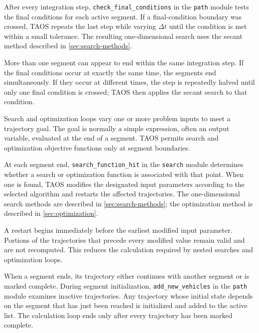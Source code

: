 After every integration step, \texttt{check\_final\_conditions} in the \texttt{path}
module tests the final conditions for each active segment. If a final-condition
boundary was crossed, TAOS repeats the last step while varying $\Delta t$ until the
condition is met within a small tolerance. The resulting one-dimensional search uses
the secant method described in \cref{sec:search-methods}.

More than one segment can appear to end within the same integration step. If the
final conditions occur at exactly the same time, the segments end simultaneously.
If they occur at different times, the step is repeatedly halved until only one final
condition is crossed; TAOS then applies the secant search to that condition.


Search and optimization loops vary one or more problem inputs to meet a trajectory
goal. The goal is normally a simple expression, often an output variable, evaluated
at the end of a segment. TAOS permits search and optimization objective functions
only at segment boundaries.

At each segment end, \texttt{search\_function\_hit} in the \texttt{search} module
determines whether a search or optimization function is associated with that point.
When one is found, TAOS modifies the designated input parameters according to the
selected algorithm and restarts the affected trajectories. The one-dimensional search
methods are described in \cref{sec:search-methods}; the optimization method is
described in \cref{sec:optimization}.

A restart begins immediately before the earliest modified input parameter. Portions
of the trajectories that precede every modified value remain valid and are not
recomputed. This reduces the calculation required by nested searches and
optimization loops.


When a segment ends, its trajectory either continues with another segment or is
marked complete. During segment initialization, \texttt{add\_new\_vehicles} in the
\texttt{path} module examines inactive trajectories. Any trajectory whose initial
state depends on the segment that has just been reached is initialized and added to
the active list. The calculation loop ends only after every trajectory has been marked
complete.
